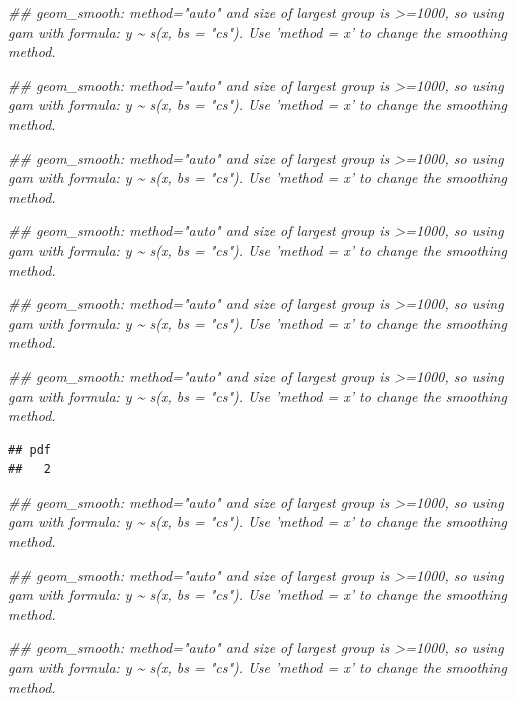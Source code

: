 \documentclass{article}\usepackage{graphicx, color}
\makeatletter
\newenvironment{kframe}{%
 \def\at@end@of@kframe{}%
 \ifinner\ifhmode%
  \def\at@end@of@kframe{\end{minipage}}%
  \begin{minipage}{\columnwidth}%
 \fi\fi%
 \def\FrameCommand##1{\hskip\@totalleftmargin \hskip-\fboxsep
 \colorbox{shadecolor}{##1}\hskip-\fboxsep
     \hskip-\linewidth \hskip-\@totalleftmargin \hskip\columnwidth}%
 \MakeFramed {\advance\hsize-\width
   \@totalleftmargin\z@ \linewidth\hsize
   \@setminipage}}%
 {\par\unskip\endMakeFramed%
 \at@end@of@kframe}
\newenvironment{knitrout}{}{} %
\makeatother
\begin{document}
\begin{knitrout}
\color{fgcolor}\begin{kframe}


{\ttfamily\noindent\itshape\textcolor{messagecolor}{\#\# geom\_smooth: method="auto" and size of largest group is >=1000, so using gam with formula: y \textasciitilde{} s(x, bs = "cs"). Use 'method = x' to change the smoothing method.}}

{\ttfamily\noindent\itshape\textcolor{messagecolor}{\#\# geom\_smooth: method="auto" and size of largest group is >=1000, so using gam with formula: y \textasciitilde{} s(x, bs = "cs"). Use 'method = x' to change the smoothing method.}}

{\ttfamily\noindent\itshape\textcolor{messagecolor}{\#\# geom\_smooth: method="auto" and size of largest group is >=1000, so using gam with formula: y \textasciitilde{} s(x, bs = "cs"). Use 'method = x' to change the smoothing method.}}

{\ttfamily\noindent\itshape\textcolor{messagecolor}{\#\# geom\_smooth: method="auto" and size of largest group is >=1000, so using gam with formula: y \textasciitilde{} s(x, bs = "cs"). Use 'method = x' to change the smoothing method.}}

{\ttfamily\noindent\itshape\textcolor{messagecolor}{\#\# geom\_smooth: method="auto" and size of largest group is >=1000, so using gam with formula: y \textasciitilde{} s(x, bs = "cs"). Use 'method = x' to change the smoothing method.}}

{\ttfamily\noindent\itshape\textcolor{messagecolor}{\#\# geom\_smooth: method="auto" and size of largest group is >=1000, so using gam with formula: y \textasciitilde{} s(x, bs = "cs"). Use 'method = x' to change the smoothing method.}}\begin{verbatim}
## pdf 
##   2
\end{verbatim}


{\ttfamily\noindent\itshape\textcolor{messagecolor}{\#\# geom\_smooth: method="auto" and size of largest group is >=1000, so using gam with formula: y \textasciitilde{} s(x, bs = "cs"). Use 'method = x' to change the smoothing method.}}

{\ttfamily\noindent\itshape\textcolor{messagecolor}{\#\# geom\_smooth: method="auto" and size of largest group is >=1000, so using gam with formula: y \textasciitilde{} s(x, bs = "cs"). Use 'method = x' to change the smoothing method.}}

{\ttfamily\noindent\itshape\textcolor{messagecolor}{\#\# geom\_smooth: method="auto" and size of largest group is >=1000, so using gam with formula: y \textasciitilde{} s(x, bs = "cs"). Use 'method = x' to change the smoothing method.}}


\end{kframe}
\end{knitrout}
\end{document}
